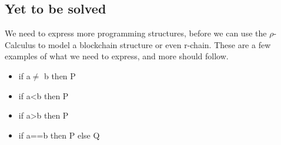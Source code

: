 \subsection{Yet to be solved}
We need to express more programming structures, before we can use the $\rho$-Calculus to model a blockchain structure or even r-chain. These are a few examples of what we need to express, and more should follow.
\begin{itemize}
\item if a$\neq$ b then P
\item if a<b then P
\item if a>b then P
\item if a==b then P else Q
\end{itemize}





